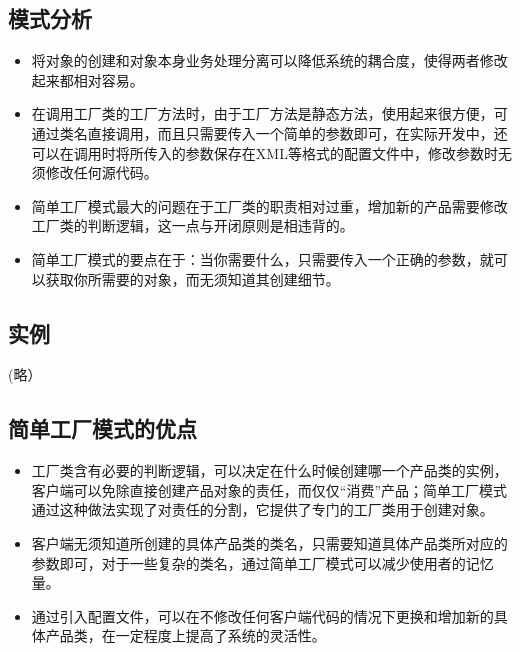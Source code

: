 \documentclass[letterpaper,10pt,english]{sphinxmanual}
\begin{document}
\subsection{模式分析}
\label{\detokenize{creational_patterns/simple_factory:id7}}\begin{itemize}
\item {} 
\sphinxAtStartPar
将对象的创建和对象本身业务处理分离可以降低系统的耦合度，使得两者修改起来都相对容易。

\item {} 
\sphinxAtStartPar
在调用工厂类的工厂方法时，由于工厂方法是静态方法，使用起来很方便，可通过类名直接调用，而且只需要传入一个简单的参数即可，在实际开发中，还可以在调用时将所传入的参数保存在XML等格式的配置文件中，修改参数时无须修改任何源代码。

\item {} 
\sphinxAtStartPar
简单工厂模式最大的问题在于工厂类的职责相对过重，增加新的产品需要修改工厂类的判断逻辑，这一点与开闭原则是相违背的。

\item {} 
\sphinxAtStartPar
简单工厂模式的要点在于：当你需要什么，只需要传入一个正确的参数，就可以获取你所需要的对象，而无须知道其创建细节。

\end{itemize}


\subsection{实例}
\label{\detokenize{creational_patterns/simple_factory:id8}}
\sphinxAtStartPar
(略）


\subsection{简单工厂模式的优点}
\label{\detokenize{creational_patterns/simple_factory:id9}}\begin{itemize}
\item {} 
\sphinxAtStartPar
工厂类含有必要的判断逻辑，可以决定在什么时候创建哪一个产品类的实例，客户端可以免除直接创建产品对象的责任，而仅仅“消费”产品；简单工厂模式通过这种做法实现了对责任的分割，它提供了专门的工厂类用于创建对象。

\item {} 
\sphinxAtStartPar
客户端无须知道所创建的具体产品类的类名，只需要知道具体产品类所对应的参数即可，对于一些复杂的类名，通过简单工厂模式可以减少使用者的记忆量。

\item {} 
\sphinxAtStartPar
通过引入配置文件，可以在不修改任何客户端代码的情况下更换和增加新的具体产品类，在一定程度上提高了系统的灵活性。

\end{itemize}
\end{document}
